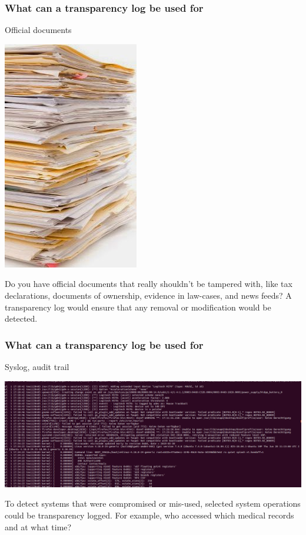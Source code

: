 \begin{frame}
  \frametitle{What can a transparency log be used for}

  \centerline{Official documents}

  \centerline{\includegraphics[scale=.2]{img/stack-of-files-rs}}
  \pause

  Do you have official documents that really shouldn't be tampered
  with, like tax declarations, documents of ownership, evidence in
  law-cases, and news feeds? A transparency log would ensure that any
  removal or modification would be detected.

\end{frame}

\begin{frame}
  \frametitle{What can a transparency log be used for}

  \centerline{Syslog, audit trail}

  \centerline{\includegraphics[scale=.1]{img/syslog}}
  \pause

  To detect systems that were compromised or mis-used, selected system
  operations could be transparency logged. For example, who accessed
  which medical records and at what time?
\end{frame}

